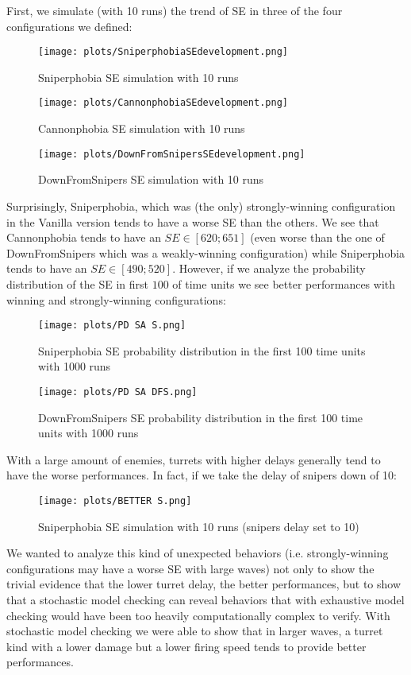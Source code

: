 \documentclass[
10pt, %
a4paper, %
oneside, %
headinclude,footinclude, %
BCOR5mm, %
]{scrartcl}
\begin{document}
			First, we simulate (with 10 runs) the trend of SE in three of the four configurations we defined:
			\begin{figure}[h!]
				\centering
				\texttt{[image: plots/SniperphobiaSEdevelopment.png]}
				\caption{Sniperphobia SE simulation with 10 runs}
			\end{figure}
			\begin{figure}[h!]
				\centering
				\begin{minipage}{.4\textwidth}
					\centering
					\texttt{[image: plots/CannonphobiaSEdevelopment.png]}
					\caption{Cannonphobia SE simulation with 10 runs}
				\end{minipage}
				\begin{minipage}{.5\textwidth}
					\centering
					\texttt{[image: plots/DownFromSnipersSEdevelopment.png]}
					\caption{DownFromSnipers SE simulation with 10 runs}
				\end{minipage}
			\end{figure}
			Surprisingly, Sniperphobia, which was (the only) strongly-winning configuration in the Vanilla version tends to have a worse SE than the others. We see that Cannonphobia tends to have an $SE\in[620;651]$ (even worse than the one of DownFromSnipers which was a weakly-winning configuration) while Sniperphobia tends to have an $SE\in[490;520]$.
			However, if we analyze the probability distribution of the SE in first $100$ of time units we see better performances with winning and strongly-winning configurations:
			\begin{figure}[h!]
				\centering
				\begin{minipage}{.4\textwidth}
					\centering
					\texttt{[image: plots/PD SA S.png]}
					\caption{Sniperphobia SE probability distribution in the first 100 time units with 1000 runs}
				\end{minipage}
				\begin{minipage}{.5\textwidth}
					\centering
					\texttt{[image: plots/PD SA DFS.png]}
					\caption{DownFromSnipers SE probability distribution in the first 100 time units with 1000 runs}
				\end{minipage}
			\end{figure}
			With a large amount of enemies, turrets with higher delays generally tend to have the worse performances. In fact, if we take the delay of snipers down of 10:
			\begin{figure}[h!]
				\centering
				\texttt{[image: plots/BETTER S.png]}
				\caption{Sniperphobia SE simulation with 10 runs (snipers delay set to 10)}
			\end{figure}
			We wanted to analyze this kind of unexpected behaviors (i.e. strongly-winning configurations may have a worse SE with large waves) not only to show the trivial evidence that the lower turret delay, the better performances, but to show that a stochastic model checking can reveal behaviors that with exhaustive model checking would have been too heavily computationally complex to verify. With stochastic model checking we were able to show that in larger waves, a turret kind with a lower damage but a lower firing speed tends to provide better performances.
			
\end{document}
